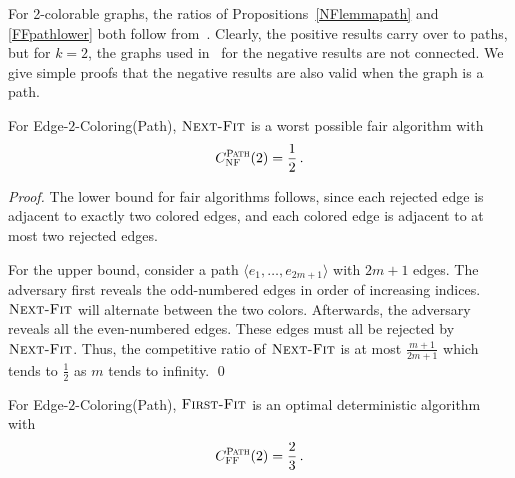 \documentclass[smallextended]{svjour3}
\def\mcpath{{\sc Edge-$2$-Coloring(Path)}\xspace}
\def\paths{\text{\sc Path}\xspace}
\newcommand{\NF}{\ensuremath{\operatorname{\textsc{Next-Fit}}}\xspace}
\newcommand{\FF}{\ensuremath{\operatorname{\textsc{First-Fit}}}\xspace}
\newcommand{\nf}{\ensuremath{\operatorname{\textsc{NF}}}\xspace}
\newcommand{\ff}{\ensuremath{\operatorname{\textsc{FF}}}\xspace}
\begin{document}
For 2-colorable graphs, the ratios of
 Propositions~\ref{NFlemmapath} and \ref{FFpathlower} both follow
 from~\cite{kedge}.
Clearly, the positive results carry over to paths, but for $k=2$, the
 graphs used in~\cite{kedge} for the negative results are not connected.
We give simple proofs that the negative results are
 also valid when the graph is a path. 

\begin{proposition} 
\label{NFlemmapath}
For \mcpath, \NF is a worst possible fair algorithm with
\begin{displaymath}
C_{\nf}^{\paths}(2)=\frac12\,.
\end{displaymath}
\end{proposition}

\begin{proof}
The lower bound for fair algorithms follows, since 
 each rejected edge is adjacent to exactly two colored edges, and each
 colored edge is adjacent to at most two rejected edges.

For the upper bound, consider a path $\langle e_1,\ldots , e_{2m+1}\rangle$ with $2m+1$ edges.
The adversary first reveals the odd-numbered edges
 in order of increasing indices.
\NF will alternate between the two colors. 
Afterwards, the adversary reveals all the even-numbered edges. These edges must all be rejected by \NF. Thus, the competitive ratio of \NF is at most $\frac{m+1}{2m+1}$ which tends to $\frac12$ as $m$ tends to infinity.
\qed
\end{proof}

\begin{proposition}
\label{FFpathlower}
For \mcpath, \FF is an optimal deterministic algorithm with
 $$C_{\ff}^{\paths}(2) = \frac23\,.$$
\end{proposition}
\end{document}
